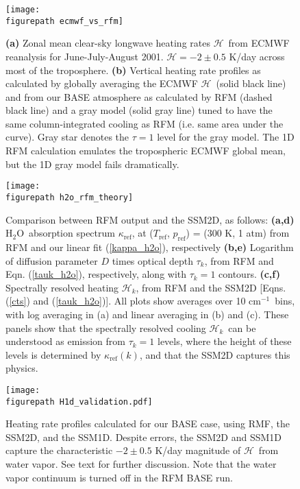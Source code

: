 \documentclass{ametsoc}
\newcommand{\eqnref}[1]{(\ref{#1})}
\newcommand{\cminverse}{\ensuremath{\mathrm{cm^{-1}}}}
\newcommand{\htwo}{\ensuremath{\mathrm{H_2O}}}
\newcommand{\ch}{\ensuremath{\mathcal{H}}}
\newcommand{\chk}{\ensuremath{\ch_k}}
\newcommand{\tauk}{\ensuremath{\tau_k}}
\newcommand{\kapparef}{\ensuremath{\kappa_{\mathrm{ref}}}}
\newcommand{\Tref}{\ensuremath{T_{\mathrm{ref}}}}
\newcommand{\pref}{\ensuremath{p_{\mathrm{ref}}}}
\newcommand{\figurepath}{./}
\begin{document}
%
\begin{figure}[h]
	\begin{center}
			\texttt{[image: \\figurepath ecmwf\_vs\_rfm]}
			\caption{\textbf{(a)}  Zonal mean clear-sky longwave heating rates \ch\ from ECMWF reanalysis for June-July-August 2001. $\ch= -2 \pm 0.5$ K/day across most of the troposphere.
						\textbf{(b)} Vertical heating rate profiles as calculated by globally averaging the ECMWF \ch\ (solid black line) and from our BASE atmosphere as calculated by RFM (dashed black line)  and a gray model (solid gray line) tuned to have the same column-integrated cooling as RFM (i.e. same area under the curve). Gray star denotes the $\tau=1$ level for the gray model. The 1D RFM calculation emulates the tropospheric ECMWF global mean, but the 1D gray model fails dramatically.
			\label{ecmwf_vs_rfm}
			}
	 \end{center}
\end{figure}

\begin{figure}[h]
	\begin{center}
			\texttt{[image: \\figurepath h2o\_rfm\_theory]}
		\caption{Comparison between RFM output and the SSM2D, as follows:
					 \textbf{(a,d)} \htwo\ absorption spectrum \kapparef, at (\Tref, \pref) = (300 K, 1 atm) from RFM and our linear fit \eqnref{kappa_h2o}, respectively
					 \textbf{(b,e)} Logarithm of diffusion parameter $D$ times optical depth $\tauk$, from RFM and Eqn. \eqnref{tauk_h2o}, respectively, along with $\tauk=1$ contours.
					 \textbf{(c,f)}  Spectrally resolved heating $\ch_k$, from RFM and  the SSM2D [Eqns. \eqnref{cts} and \eqnref{tauk_h2o}]. 
					 All plots show averages over 10 \cminverse\ bins, with log averaging in (a) and linear averaging in (b) and (c). These panels show that the spectrally resolved cooling \chk\ can be understood as emission from $\tauk=1$ levels, where the height of these levels is determined by $\kapparef(k)$, and that  the SSM2D  captures this physics.
		\label{h2o_rfm_theory}
		}
	\end{center}
\end{figure}


\begin{figure}[h!]
	\begin{center}
			\texttt{[image: \\figurepath H1d\_validation.pdf]}
		\caption{ Heating rate profiles calculated for our BASE case, using RMF, the SSM2D, and the SSM1D.  Despite errors, the SSM2D and SSM1D capture the characteristic $-2 \pm 0.5$ K/day magnitude of \ch\ from water vapor. See text for further discussion. Note that the water vapor continuum is turned off in the RFM BASE run.
	  \label{H1d_validation}
		}
	\end{center}
\end{figure}
\end{document}

